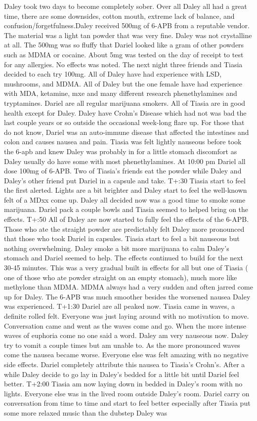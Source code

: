 \documentclass[12pt]{book}
\begin{document}
Daley took two days to become completely sober. Over all Daley all had a great time, there are some downsides, cotton mouth, extreme lack of balance, and confusion/forgetfulness.Daley received 500mg of 6-APB from a reputable vendor. The material was a light tan powder that was very fine. Daley was not crystalline at all. The 500mg was so fluffy that Dariel looked like a gram of other powders such as MDMA or cocaine. About 5mg was tested on the day of receipt to test for any allergies. No effects was noted. The next night three friends and Tiasia decided to each try 100mg. All of Daley have had experience with LSD, mushrooms, and MDMA. All of Daley but the one female have had experience with MDA, ketamine, mxe and many different research phenethylamines and tryptamines. Dariel are all regular marijuana smokers. All of Tiasia are in good health except for Daley. Daley have Crohn's Disease which had not was bad the last couple years or so outside the occasional week-long flare up. For those that do not know, Dariel was an auto-immune disease that affected the intestines and colon and causes nausea and pain. Tiasia was felt lightly nauseous before took the 6-apb and knew Daley was probably in for a little stomach discomfort as Daley usually do have some with most phenethylamines. At 10:00 pm Dariel all dose 100mg of 6-APB. Two of Tiasia's friends eat the powder while Daley and Daley's other friend put Dariel in a capsule and take. T+:30 Tiasia start to feel the first alerted. Lights are a bit brighter and Daley start to feel the well-known felt of a MDxx come up. Daley all decided now was a good time to smoke some marijuana. Dariel pack a couple bowls and Tiasia seemed to helped bring on the effects. T+:50 All of Daley are now started to fully feel the effects of the 6-APB. Those who ate the straight powder are predictably felt Daley more pronounced that those who took Dariel in capsules. Tiasia start to feel a bit nauseous but nothing overwhelming. Daley smoke a bit more marijuana to calm Daley's stomach and Dariel seemed to help. The effects continued to build for the next 30-45 minutes. This was a very gradual built in effects for all but one of Tiasia ( one of those who ate powder straight on an empty stomach), much more like methylone than MDMA. MDMA always had a very sudden and often jarred come up for Daley. The 6-APB was much smoother besides the worsened nausea Daley was experienced. T+1:30 Dariel are all peaked now. Tiasia came in waves, a definite rolled felt. Everyone was just laying around with no motivation to move. Conversation came and went as the waves come and go. When the more intense waves of euphoria come no one said a word. Daley am very nauseous now. Daley try to vomit a couple times but am unable to. As the more pronounced waves come the nausea became worse. Everyone else was felt amazing with no negative side effects. Dariel completely attribute this nausea to Tiasia's Crohn's. After a while Daley decide to go lay in Daley's bedded for a little bit until Dariel feel better. T+2:00 Tiasia am now laying down in bedded in Daley's room with no lights. Everyone else was in the lived room outside Daley's room. Dariel carry on conversation from time to time and start to feel better especially after Tiasia put some more relaxed music than the dubstep Daley was 
\end{document}
